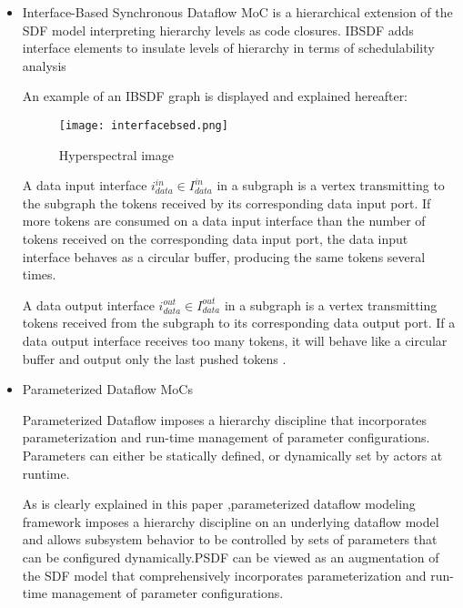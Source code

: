    \begin{itemize}
   \item Interface-Based Synchronous Dataflow MoC is a hierarchical extension of the SDF model interpreting hierarchy levels as code closures. IBSDF adds interface elements to insulate levels of hierarchy in terms of schedulability analysis \cite{desnos2013pimm}
   
   An example of an IBSDF graph is displayed and explained hereafter:
      
     \begin{figure}[H]
        \texttt{[image: interfacebsed.png]}        
        \centering    
        \caption{Hyperspectral image}
        \label{fig:systemArch}
    \end{figure}
       
A data input interface $i_{data}^{in} \in I_{data}^{in}$ in a subgraph is a vertex transmitting to the subgraph the tokens received by its corresponding data input port. If more tokens are consumed
on a data input interface than the number of tokens received on the corresponding data input port, the data input interface behaves as a circular buffer, producing the same tokens several times.

 A data output interface $i_{data}^{out} \in I_{data}^{out}$ in a subgraph is a vertex transmitting tokens received from the subgraph to its corresponding data output port. If a data output interface
receives too many tokens, it will behave like a circular buffer and output only the last pushed tokens \cite{desnos2013pimm}.

  
   \item Parameterized Dataflow MoCs

Parameterized Dataflow imposes a hierarchy discipline   that incorporates parameterization and run-time management of parameter configurations. Parameters can either be statically defined, or dynamically set by actors at runtime.

As is clearly explained in this paper \cite{bhattacharya2001parameterized},parameterized dataflow modeling framework imposes a hierarchy discipline on an underlying dataflow model and allows subsystem behavior to be controlled by sets of parameters that can be configured dynamically.PSDF can be viewed as an augmentation of the SDF model that comprehensively incorporates parameterization and run-time management of parameter configurations.

\end{itemize}      
         
